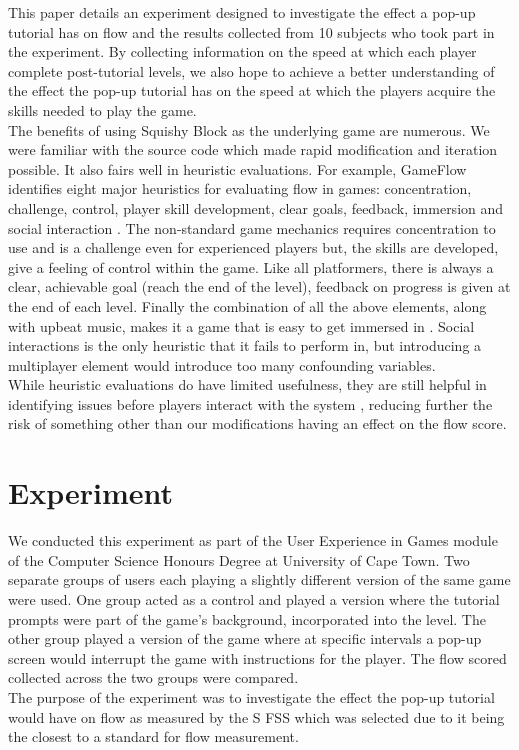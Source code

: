 \documentclass{acmsiggraph}
\begin{document}
This paper details an experiment designed to investigate the effect a pop-up tutorial has on flow and the results collected from 10 subjects who took part in the experiment.  
By collecting information on the speed at which each player complete post-tutorial levels, we also hope to achieve a better understanding of the effect the pop-up tutorial has on the speed at which the players acquire the skills needed to play the game.\\
The benefits of using Squishy Block as the underlying game are numerous. We were familiar with the source code which made rapid modification and iteration possible. It also fairs well in heuristic evaluations. For example, GameFlow identifies eight major heuristics for evaluating flow in games: concentration, challenge, control, player skill development, clear goals, feedback, immersion and social interaction \cite{sweetser}. The non-standard game mechanics requires concentration to use and is a challenge even for experienced players but, the skills are developed, give a feeling of control within the game. Like all platformers, there is always a clear, achievable goal (reach the end of the level), feedback on progress is given at the end of each level. Finally the combination of all the above elements, along with upbeat music, makes it a game that is easy to get immersed in \cite{sanders}. Social interactions is the only heuristic that it fails to perform in, but introducing a multiplayer element would introduce too many confounding variables.\\
While heuristic evaluations do have limited usefulness, they are still helpful in identifying issues before players interact with the system \cite{desurvire}, reducing further the risk of something other than our modifications having an effect on the flow score.  

\section{Experiment}

We conducted this experiment as part of the User Experience in Games module of the Computer Science Honours Degree at University of Cape Town. Two separate groups of users each playing a slightly different version of the same game were used. One group acted as a control and played a version where the tutorial prompts were part of the game's background, incorporated into the level. The other group played a version of the game where at specific intervals a pop-up screen would interrupt the game with instructions for the player. The flow scored collected across the two groups were compared.\\
The purpose of the experiment was to investigate the effect the pop-up tutorial would have on flow as measured by the S FSS which was selected due to it being the closest to a standard for flow measurement.\cite{jackson}
\end{document}
